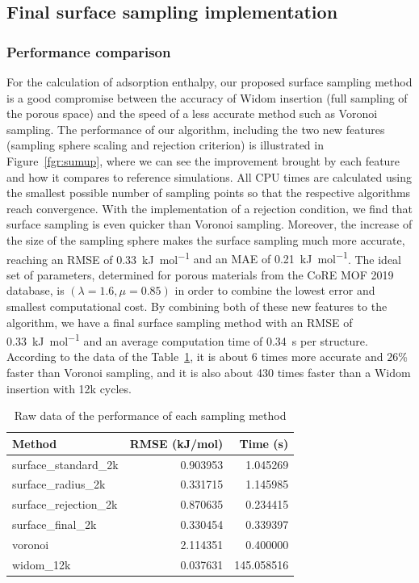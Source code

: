 \documentclass[main]{subfiles}
\begin{document}
\subsection{Final surface sampling implementation}

\subsubsection{Performance comparison}

For the calculation of adsorption enthalpy, our proposed surface sampling method is a good compromise between the accuracy of Widom insertion (full sampling of the porous space) and the speed of a less accurate method such as Voronoi sampling. The performance of our algorithm, including the two new features (sampling sphere scaling and rejection criterion) is illustrated in Figure~\ref{fgr:sumup}, where we can see the improvement brought by each feature and how it compares to reference simulations. All CPU times are calculated using the smallest possible number of sampling points so that the respective algorithms reach convergence. With the implementation of a rejection condition, we find that surface sampling is even quicker than Voronoi sampling. Moreover, the increase of the size of the sampling sphere makes the surface sampling much more accurate, reaching an RMSE of \SI{0.33}{\kilo\joule\per\mole} {and an MAE of \SI{0.21}{\kilo\joule\per\mole}}. The ideal set of parameters, determined for porous materials from the CoRE MOF 2019 database, is $(\lambda = 1.6, \mu = 0.85)$ in order to combine the lowest error and smallest computational cost. By combining both of these new features to the algorithm, we have a final surface sampling method with an RMSE of \SI{0.33}{\kilo\joule\per\mole} and an average computation time of \SI{0.34}{\second} per structure. According to the data of the Table~\ref{tab:sumup}, it is about 6 times more accurate and {$26$\%} faster than Voronoi sampling, and it is also about 430 times faster than a Widom insertion with 12k cycles.

\begin{table}[ht]
  \begin{tabular}{|l|r|r|}
  \hline
                Method &  RMSE (kJ/mol) &   Time (s) \\
  \hline
   surface\_standard\_2k &       0.903953 &   1.045269 \\
     surface\_radius\_2k &       0.331715 &   1.145985 \\
  surface\_rejection\_2k &       0.870635 &   0.234415 \\
      surface\_final\_2k &       0.330454 &   0.339397 \\
               voronoi &       2.114351 &   0.400000 \\
             widom\_12k &       0.037631 & 145.058516 \\
  \hline
  \end{tabular}
  \caption{Raw data of the performance of each sampling method}\label{tab:sumup}
\end{table}
  
\end{document}
